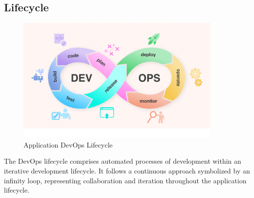 \subsection{Lifecycle}
\begin{figure}[H]
  \centering
  \includegraphics[width=0.9\textwidth]{src/assets/chapters/devopslifecycle.png}
  \caption{Application DevOps Lifecycle}
  \label{fig:application-devops-lifecycle}
\end{figure}

The DevOps lifecycle comprises automated processes of development within an iterative development lifecycle. It follows a continuous approach symbolized by an infinity loop, representing collaboration and iteration throughout the application lifecycle.

